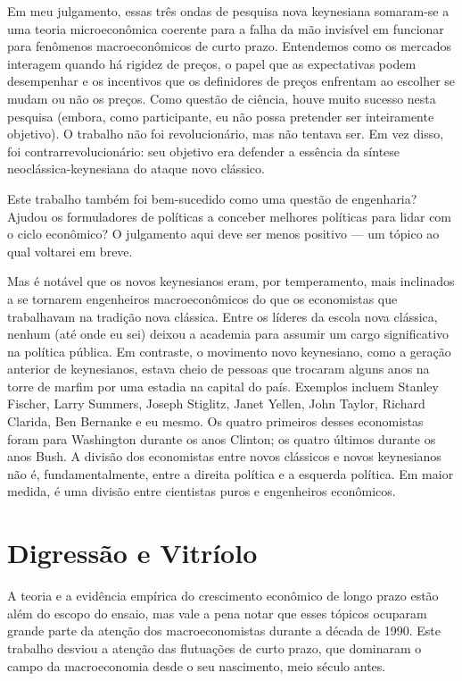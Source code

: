 \documentclass[12pt]{article}
\begin{document}
Em meu julgamento, essas três ondas de pesquisa nova keynesiana somaram-se a uma teoria microeconômica coerente para a falha da mão invisível em funcionar para fenômenos macroeconômicos de curto prazo. Entendemos como os mercados interagem quando há rigidez de preços, o papel que as expectativas podem desempenhar e os incentivos que os definidores de preços enfrentam ao escolher se mudam ou não os preços. Como questão de ciência, houve muito sucesso nesta pesquisa (embora, como participante, eu não possa pretender ser inteiramente objetivo). O trabalho não foi revolucionário, mas não tentava ser. Em vez disso, foi contrarrevolucionário: seu objetivo era defender a essência da síntese neoclássica-keynesiana do ataque novo clássico.

Este trabalho também foi bem-sucedido como uma questão de engenharia? Ajudou os formuladores de políticas a conceber melhores políticas para lidar com o ciclo econômico? O julgamento aqui deve ser menos positivo — um tópico ao qual voltarei em breve.

Mas é notável que os novos keynesianos eram, por temperamento, mais inclinados a se tornarem engenheiros macroeconômicos do que os economistas que trabalhavam na tradição nova clássica. Entre os líderes da escola nova clássica, nenhum (até onde eu sei) deixou a academia para assumir um cargo significativo na política pública. Em contraste, o movimento novo keynesiano, como a geração anterior de keynesianos, estava cheio de pessoas que trocaram alguns anos na torre de marfim por uma estadia na capital do país. Exemplos incluem Stanley Fischer, Larry Summers, Joseph Stiglitz, Janet Yellen, John Taylor, Richard Clarida, Ben Bernanke e eu mesmo. Os quatro primeiros desses economistas foram para Washington durante os anos Clinton; os quatro últimos durante os anos Bush. A divisão dos economistas entre novos clássicos e novos keynesianos não é, fundamentalmente, entre a direita política e a esquerda política. Em maior medida, é uma divisão entre cientistas puros e engenheiros econômicos.

\section{Digressão e Vitríolo}

A teoria e a evidência empírica do crescimento econômico de longo prazo estão além do escopo do ensaio, mas vale a pena notar que esses tópicos ocuparam grande parte da atenção dos macroeconomistas durante a década de 1990. Este trabalho desviou a atenção das flutuações de curto prazo, que dominaram o campo da macroeconomia desde o seu nascimento, meio século antes.
\end{document}
